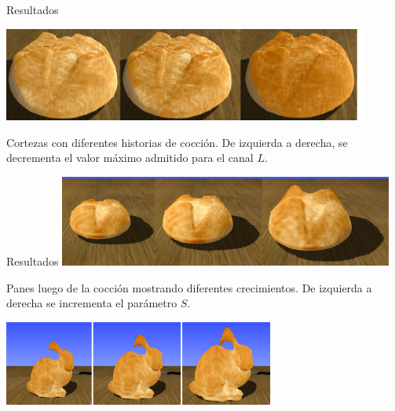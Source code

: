 \documentclass[spanish,unknownkeysallowed,10pt]{beamer}
\begin{document}
\begin{frame}{Resultados}

\centerline{\includegraphics[width=12cm]{../figures/Fig13}}
Cortezas con diferentes historias de cocción. De izquierda a derecha, se decrementa el valor máximo admitido para el canal $L$.

\end{frame}

\begin{frame}{Resultados}
\includegraphics[width=11cm]{../figures/Fig14}

Panes luego de la cocción mostrando diferentes crecimientos. De izquierda a derecha se incrementa el parámetro $S$.

\includegraphics[width=9cm]{../figures/Fig15}


\end{frame}


\end{document}
